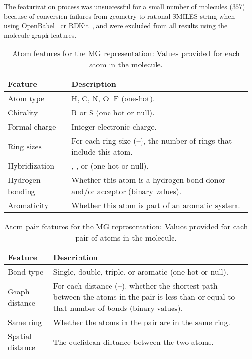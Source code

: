 \documentclass[reprint, superscriptaddress,
amsmath,amssymb, aps, prb,
]{revtex4-1}
\begin{document}
{The featurization process was unsuccessful for a small number of molecules (367) because of conversion failures from geometry to rational SMILES string when using OpenBabel~\cite{obabel} or RDKit~\cite{landrum2014rdkit}, and were excluded from all results using the molecule graph features.

\begin{table}[htbp]
    \caption{Atom features for the MG representation: Values provided for each atom in the molecule.}
    \label{table:atom_features}
    \centering
    \begin{tabular}{ l| p{5cm} }
    \toprule
    Feature & Description \\\hline\hline
    \midrule
    Atom type & H, C, N, O, F (one-hot). \\\hline
    Chirality & R or S (one-hot or null). \\\hline
    Formal charge & Integer electronic charge.  \\\hline
Ring sizes & For each ring size (--), the number of rings that include
                 this atom.  \\\hline
    Hybridization & , , or  (one-hot or null).  \\\hline
    Hydrogen bonding & Whether this atom is a hydrogen bond donor and/or
                       acceptor (binary values).  \\\hline
    Aromaticity & Whether this atom is part of an aromatic system. \\
    \bottomrule
    \end{tabular}
\end{table}

\begin{table}[htbp]
    \caption{Atom pair features for the MG representation: Values provided for each pair of atoms in the molecule.}
    \label{table:pair_features}
    \centering
    \begin{tabular}{ l| p{6cm} }
    \toprule
    Feature & Description  \\\hline\hline
    \midrule
    Bond type & Single, double, triple, or aromatic (one-hot or null). \\\hline
    Graph distance &For each distance (--), whether the shortest path between the atoms in the pair is less than or equal to that number of bonds (binary values). \\\hline
    Same ring & Whether the atoms in the pair are in the same ring.  \\\hline
    Spatial distance & The euclidean distance between the two atoms.  \\
    \bottomrule
    \end{tabular}
\end{table}

}
\end{document}
